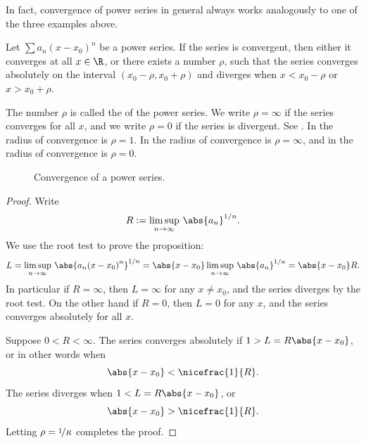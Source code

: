 \documentclass[12pt]{book}
\begin{document}
In fact, convergence of power series in general always works analogously to
one of the three examples above.

\begin{prop}
Let $\sum a_n {(x-x_0)}^n$ be a power series.
If the series is convergent, then either it converges at
all $x \in \R$, or
there exists a number $\rho$, such that
the series converges absolutely on the interval
$(x_0-\rho,x_0+\rho)$ and diverges when $x < x_0-\rho$ or $x > x_0+\rho$.
\end{prop}

The number $\rho$ is called the \emph{} of the
power series.
We write $\rho = \infty$ if the series converges for
all $x$, and we write $\rho = 0$ if the series is divergent.
See .
In 
the radius of convergence is $\rho=1$.
In  the radius of convergence is $\rho=\infty$,
and in  the radius of convergence is $\rho=0$.

\begin{figure}[h!t]
\begin{center}

\caption{Convergence of a power series.\label{ps:convfig}}
\end{center}
\end{figure}

\begin{proof}
Write
\begin{equation*}
R := \limsup_{n\to\infty} \, {\abs{a_n}}^{1/n} .
\end{equation*}
We use the root test to prove the proposition:
\begin{equation*}
L = \limsup_{n\to\infty} \, {\abs{a_n {(x-x_0)}^n}}^{1/n} 
=
\abs{x-x_0} \limsup_{n\to\infty} \, {\abs{a_n}}^{1/n}
=
\abs{x-x_0} R .
\end{equation*}
In particular if $R = \infty$, then $L=\infty$ for any $x \not= x_0$, and
the series diverges by the root test.
On the
other hand if $R = 0$, then $L=0$ for any $x$, and the series 
converges absolutely for all $x$.

Suppose $0 < R < \infty$.
The series
converges absolutely if
$1 > L = R \abs{x-x_0}$,
or in other words when
\begin{equation*}
\abs{x-x_0} < \nicefrac{1}{R} .
\end{equation*}
The series diverges when
$1 < L = R \abs{x-x_0}$,
or
\begin{equation*}
\abs{x-x_0} > \nicefrac{1}{R} .
\end{equation*}
Letting $\rho = \nicefrac{1}{R}$ completes the proof.
\end{proof}
\end{document}
